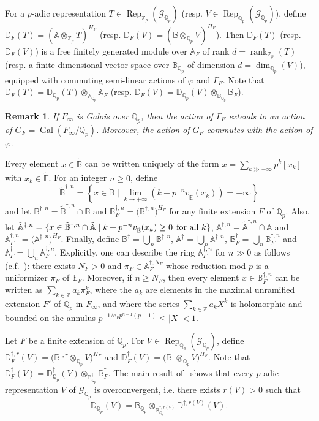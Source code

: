 \documentclass{amsart}
\newcommand{\QQ}{\mathbb Q}
\newcommand{\ZZ}{\mathbb Z}
\newcommand{\EE}{\mathbb E}
\newcommand{\BB}{\mathbb B}
\newcommand{\DD}{\mathbb D}
\renewcommand{\AA}{\mathbb A}
\DeclareMathOperator{\Gal}{Gal}
\DeclareMathOperator{\rank}{rank}
\DeclareMathOperator{\Rep}{Rep}
\newcommand{\Qp}{\QQ_p}
\newcommand{\calG}{\mathcal{G}}
\newcommand{\vp}{\varphi}
\newtheorem{remark}[theorem]{Remark}
\begin{document}
   For a $p$-adic representation $T\in\Rep_{\ZZ_p}(\calG_{\QQ_p})$ (resp. $V\in\Rep_{\QQ_p}(\calG_{\Qp})$), define $\DD_F(T)=(\AA\otimes_{\ZZ_p}T)^{H_F}$ (resp. $\DD_F(V)=(\BB\otimes_{\QQ_p}V)^{H_F}$). Then $\DD_F(T)$ (resp. $\DD_F(V)$) is a free finitely generated module over $\AA_F$ of rank $d=\rank_{\ZZ_p}(T)$ (resp. a finite dimensional vector space over $\BB_{\QQ_p}$ of dimension $d=\dim_{\QQ_p}(V)$), equipped with commuting semi-linear actions of $\vp$ and $\Gamma_F$.  Note that $\DD_{F}(T)=\DD_{\QQ_p}(T)\otimes_{\AA_{\QQ_p}}\AA_F$ (resp. $\DD_F(V)=\DD_{\QQ_p}(V)\otimes_{\BB_{\QQ_p}}\BB_F$).
 
   \begin{remark}\label{extendaction}
    If $F_\infty$ is Galois over $\QQ_p$, then the action of $\Gamma_F$ extends to an action of $G_F=\Gal(F_\infty\slash\QQ_p)$. Moreover, the action of $G_F$ commutes with the action of $\vp$.
   \end{remark}

   Every element $x\in\tilde{\BB}$ can be written uniquely of the form $x=\sum_{k\gg-\infty}p^k[x_k]$ with $x_k\in\tilde{\EE}$. For an integer $n\ge0$, define
   \[ \tilde{\BB}^{\dagger,n}=\left\{ x\in\tilde{\BB}\mid \lim_{k\rightarrow+\infty}\left(k+p^{-n}v_{\tilde{\EE}}(x_k)\right)=+\infty\right\}\]
   and let $\BB^{\dagger,n}=\tilde{\BB}^{\dagger,n}\cap\BB$ and $\BB^{\dagger,n}_F=\big(\BB^{\dagger,n}\big)^{H_F}$ for any finite extension $F$ of $\QQ_p$. Also, let $\tilde{\AA}^{\dagger,n}=\{x\in\tilde{\BB}^{\dagger,n}\cap\tilde{\AA}\mid k+ p^{-n}v_{\tilde{\EE}}(x_k)\geq 0 \hspace{1ex} \text{for all $k$}\}$, $\AA^{\dagger,n}=\tilde{\AA}^{\dagger,n}\cap \AA$ and $\AA^{\dagger,n}_F=\big(\AA^{\dagger,n}\big)^{H_F}$. Finally, define $\BB^\dagger=\bigcup_n\BB^{\dagger,n}$, $\AA^\dagger=\bigcup_n\AA^{\dagger,n}$, $\BB_F^\dagger=\bigcup_n\BB_F^{\dagger,n}$ and $\AA_F^\dagger=\bigcup_n\AA_F^{\dagger,n}$. Explicitly, one can describe the ring $\AA^{\dagger,n}_F$ for $n\gg 0$ as follows (c.f.~\cite[Proposition 1.4]{berger02}): there exists $N_F>0$ and $\pi_F\in\AA^{\dagger,N_F}_F$ whose reduction mod $p$ is a uniformizer $\overline{\pi_F}$ of $\EE_F$. Moreover, if $n\geq N_F$, then every element $x\in\BB^{\dagger,n}_F$ can be written as $\sum_{k\in\ZZ}a_k\pi_F^k$, where the $a_k$ are elements in the maximal unramified extension $F'$ of $\QQ_p$ in $F_\infty$, and where the series $\sum_{k\in\ZZ}a_kX^k$ is holomorphic and bounded on the annulus $p^{-1/e_F p^{n-1}(p-1)}\leq\mid X\mid<1$.
 
   Let $F$ be a finite extension of $\QQ_p$. For $V\in \Rep_{\QQ_p}(\calG_{\QQ_p})$, define $\DD_F^{\dagger,r}(V)=\big(\BB^{\dagger,r}\otimes_{\QQ_p}V\big)^{H_F}$ and $\DD_F^{\dagger}(V)=\big(\BB^{\dagger}\otimes_{\QQ_p}V\big)^{H_F}$.  Note that $\DD^\dagger_F(V)=\DD^\dagger_{\QQ_p}(V)\otimes_{\BB^\dagger_{\QQ_p}}\BB^{\dagger}_F$. The main result of~\cite{cherbonniercolmez98} shows that every $p$-adic representation $V$ of $\calG_{\QQ_p}$ is overconvergent, i.e. there exists $r(V)>0$ such that 
   \[ \DD_{\QQ_p}(V)=\BB_{\QQ_p}\otimes_{\BB^{\dagger,r(V)}_{\QQ_p}}\DD^{\dagger,r(V)}(V).\]
\end{document}
